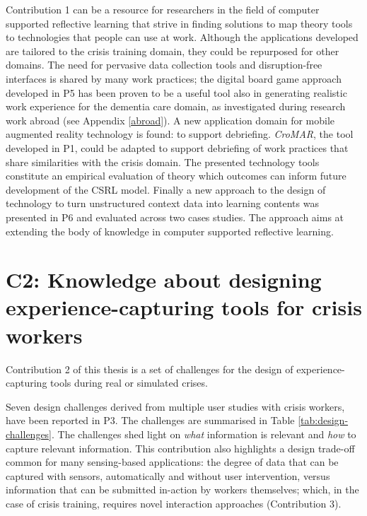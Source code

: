Contribution 1 can be a resource for researchers in the field of computer supported reflective learning that strive in finding solutions to map theory tools to technologies that people can use at work. Although the applications developed are tailored to the crisis training domain, they could be repurposed for other domains. The need for pervasive data collection tools and disruption-free interfaces is shared by many work practices; the digital board game approach developed in P5 has been proven to be a useful tool also in generating realistic work experience for the dementia care domain, as investigated during research work abroad (see Appendix \ref{abroad}). A new application domain for mobile augmented reality technology is found: to support debriefing. \emph{CroMAR}, the tool developed in P1, could be adapted to support debriefing of work practices that share similarities with the crisis domain. The presented technology tools constitute an empirical evaluation of theory which outcomes can inform future development of the CSRL model. Finally a new approach to the design of technology to turn unstructured context data into learning contents was presented in P6 and evaluated across two cases studies. The approach aims at extending the body of knowledge in computer supported reflective learning.

\section[C2: Knowledge about designing experience-capturing tools for crisis workers][Contribution 2]{C2: Knowledge about designing experience-capturing tools for crisis workers}\label{c2-knowledge-about-designing-experience-capturing-tools-for-crisis-workers}

Contribution 2 of this thesis is a set of challenges for the design of experience-capturing tools during real or simulated crises.

Seven design challenges derived from multiple user studies with crisis workers, have been reported in P3. The challenges are summarised in Table \ref{tab:design-challenges}. The challenges shed light on \emph{what} information is relevant and \emph{how} to capture relevant information. This contribution also highlights a design trade-off common for many sensing-based applications: the degree of data that can be captured with sensors, automatically and without user intervention, versus information that can be submitted in-action by workers themselves; which, in the case of crisis training, requires novel interaction approaches (Contribution 3). 

